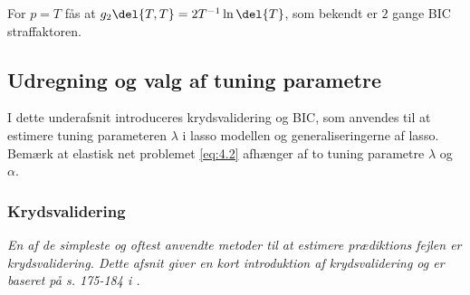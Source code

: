 For \(p = T\) fås at \(g_2 \del{T,T} = 2 T^{-1} \ln \del{T}\), som bekendt er \(2\) gange BIC straffaktoren.


\subsection{Udregning og valg af tuning parametre}
I dette underafsnit introduceres krydsvalidering og BIC, som anvendes til at estimere tuning parameteren \(\lambda\) i lasso modellen og generaliseringerne af lasso.
Bemærk at elastisk net problemet \eqref{eq:4.2} afhænger af to tuning parametre \(\lambda\) og \(\alpha\).


\subsubsection{Krydsvalidering}
\textit{En af de simpleste og oftest anvendte metoder til at estimere prædiktions fejlen er krydsvalidering. 
Dette afsnit giver en kort introduktion af krydsvalidering og er baseret på s. 175-184 i \citep{james}.}

%

